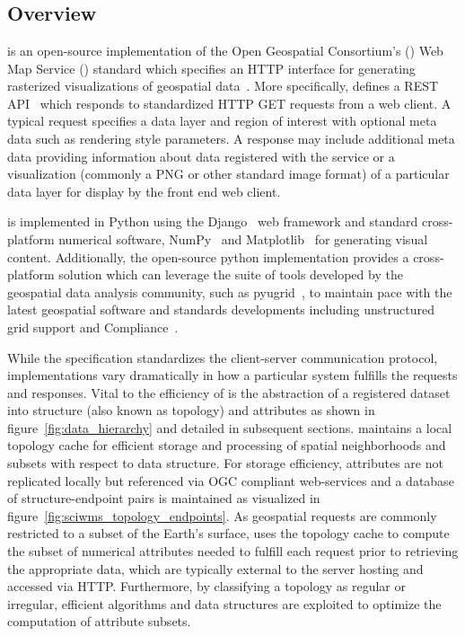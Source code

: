 \section{\sciwms{}}
\label{sec:sciwms}

\subsection{Overview}
\label{sec:overview}
\Sciwms{} is an open-source implementation of the Open Geospatial
Consortium's (\ogc{}) Web Map Service (\wms{}) standard which
specifies an HTTP interface for generating rasterized visualizations
of geospatial data~\cite{wms14}. More specifically, \wms{} defines a
REST API~\cite{Fielding02} which responds to standardized HTTP GET requests from a
web client. A typical \wms{} request specifies a data layer and region
of interest with optional meta data such as rendering style
parameters. A \wms{} response may include additional meta data
providing information about data registered with the service or a
visualization (commonly a PNG or other standard image format) of a
particular data layer for display by the front end web client.

\sciwms{} is implemented in Python using the Django~\cite{django} web
framework and standard cross-platform numerical software,
NumPy~\cite{numpy11} and Matplotlib~\cite{hunter07} for generating
visual content. Additionally, the open-source python implementation
provides a cross-platform \wms{} solution which can leverage the suite
of tools developed by the geospatial data analysis community, such as
pyugrid~\cite{pyugrid}, to maintain pace with the latest geospatial
software and standards developments including unstructured grid
support and \cfugrid{} Compliance~\cite{cfugrid}.

While the \ogc{} \wms{} specification standardizes the client-server
communication protocol, \wms{} implementations vary dramatically in
how a particular system fulfills the \wms{} requests and
responses. Vital to the efficiency of \sciwms{} is the abstraction of
a registered dataset into structure (also known as topology) and
attributes as shown in figure~\ref{fig:data_hierarchy} and detailed in
subsequent sections. \Sciwms{} maintains a local topology cache for
efficient storage and processing of spatial neighborhoods and subsets
with respect to data structure. For storage efficiency, attributes are
not replicated locally but referenced via OGC compliant web-services
and a database of structure-endpoint pairs is maintained as visualized
in figure~\ref{fig:sciwms_topology_endpoints}. As geospatial
\wms{} requests are commonly restricted to a subset of the Earth's
surface, \sciwms{} uses the topology cache to compute the subset of
numerical attributes needed to fulfill each request prior to
retrieving the appropriate data, which are typically external to
the server hosting \sciwms{} and accessed via HTTP. Furthermore, by
classifying a topology as regular or irregular, efficient algorithms
and data structures are exploited to optimize the computation of
attribute subsets.
